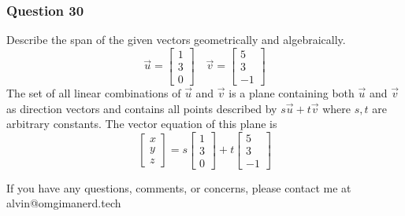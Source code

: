 \documentclass{math}
\begin{document}
\subsubsection*{Question 30}
Describe the span of the given vectors geometrically and algebraically.
\[ \vec{u} = \begin{bmatrix}1 \\ 3 \\ 0\end{bmatrix} \quad
  \vec{v} = \begin{bmatrix}5 \\ 3 \\ -1\end{bmatrix} \]
The set of all linear combinations of \( \vec{u} \) and \( \vec{v} \) is a
plane containing both \( \vec{u} \) and \( \vec{v} \) as direction vectors
and contains all points described by \( s\vec{u}+t\vec{v} \) where \( s,t \)
are arbitrary constants. The vector equation of this plane is
\[ \begin{bmatrix}x \\ y \\ z\end{bmatrix} =
  s\begin{bmatrix}1 \\ 3 \\ 0\end{bmatrix}+
  t\begin{bmatrix}5 \\ 3 \\ -1\end{bmatrix} \]

\begin{center}
  If you have any questions, comments, or concerns, please contact me at
  alvin@omgimanerd.tech
\end{center}
\end{document}
